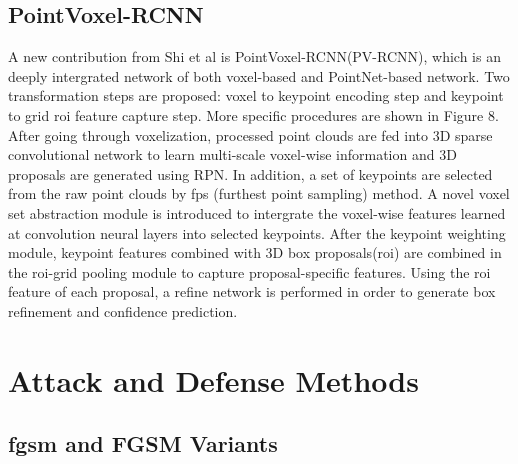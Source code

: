 \subsection{PointVoxel-RCNN}
A new contribution from Shi et al is PointVoxel-RCNN(PV-RCNN), which is an deeply intergrated network of both voxel-based and PointNet-based network\cite{shi_pv-rcnn_2021}. Two transformation steps are proposed: voxel to keypoint encoding step and keypoint to grid \acrshort{roi} feature capture step. More specific procedures are shown in Figure 8. After going through voxelization, processed point clouds are fed into 3D sparse convolutional network to learn multi-scale voxel-wise information and 3D proposals are generated using RPN. In addition, a set of keypoints are selected from the raw point clouds by \acrshort{fps} (furthest point sampling) method. A novel voxel set abstraction module is introduced to intergrate the voxel-wise features learned at convolution neural layers into selected keypoints. After the keypoint weighting module, keypoint features combined with 3D box proposals(\acrshort{roi}) are combined in the \acrshort{roi}-grid pooling module to capture proposal-specific features. Using the \acrshort{roi} feature of each proposal, a refine network is performed in order to generate box refinement and confidence prediction.
\section{Attack and Defense Methods}
\subsection{\acrshort{fgsm} and FGSM Variants}
